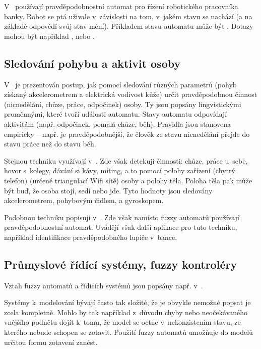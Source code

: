 V~\cite{SchYou-ProSimHumMacDia} používají pravděpodobnostní automat pro řízení robotického pracovníka banky. Robot se ptá uživale v~závislosti na tom, v~jakém stavu se nachází (a na základě odpovědí svůj stav mění). Příkladem stavu automatu může být . Dotazy mohou být například ,  nebo .


\subsection{Sledování pohybu a aktivit osoby}
V~\cite{TriHei-LinSumHumActSkiConAcc} je prezentován postup, jak pomocí sledování různých parametrů (pohyb získaný akcelerometrem a elektrická vodivost kůže) určit pravděpodobnou činnost (nicnedělání, chůze, práce, odpočinek) osoby. Ty jsou popsány lingvistickými proměnnými, které tvoří události automatu. Stavy automatu odpovídají aktivitám (např. odpočinek, pomalá chůze, běh). Pravidla jsou stanovena empiricky -- např. je pravděpodobnější, že člověk ze stavu nicnedělání přejde do stavu práce než do stavu běh.

Stejnou techniku využívají v~\cite{Alv+-HumActRec+}. Zde však detekují činnosti: chůze, práce u~sebe, hovor s~kolegy, dávání si kávy, míting, a to pomocí polohy zařízení (chytrý telefon) (určené triangulací Wifi sítě) osoby a polohy těla. Poloha těla pak může být buď, že osoba stojí, sedí nebo jde. Tyto hodnoty jsou sledovány akcelerometrem, pohybovým čidlem, a gyroskopem. 

Podobnou techniku popisují v~\cite{TurChe-MacRecHumActSur}. Zde však namísto fuzzy automatů používají pravděpodobnostní automat. Uvádějí však další aplikace pro tuto techniku, například identifikace pravděpodobného lupiče v~bance.

\subsection{Průmyslové řídící systémy, fuzzy kontroléry}
Vztah fuzzy automatů a řídících systémů jsou popsány např. v~\cite{HeKinSep-DecMakFuzEnvZUsOntCon+, Gra+-ApFuStFuOuFinMaPrRecVioOntAss, WeeFu-FormFuzAutAppModLeaSys, GraFodDri-HybFuzBooAutOntCont}. 

Systémy k~modelování bývají často tak složité, že je obvykle nemožné popsat je zcela kompletně. Mohlo by tak například z~důvodu chyby nebo neočekávaného vnějšího podnětu dojít k~tomu, že model se octne v~nekonzistením stavu, ze kterého nebude schopen se zotavit. Použití fuzzy automatů umožňuje do modelů určitou formu zotavení zanést.

